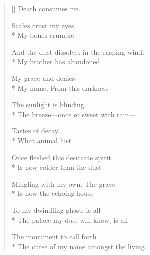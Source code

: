 \label{ch:lear_bq}
\settowidth{\versewidth}{And the dust dissolves in the rasping wind.}
\begin{verse}[\versewidth]
Death consumes me.

Scales crust my eyes.\\*
My bones crumble

And the dust dissolves in the rasping wind.\\*
My brother has abandoned

My grave and denies\\*
My name. From this darkness

The sunlight is blinding.\\*
The breeze---once so sweet with rain---

Tastes of decay.\\*
\hspace*{2\vgap} What animal lust

Once fleshed this desiccate spirit\\*
Is now colder than the dust

Mingling with my own. \qquad The grave\\*
Is now the echoing house

To my dwindling ghost, is all\\*
The palace my dust will know, is all

The monument to call forth\\*
The curse of my name amongst the living.
\end{verse}
